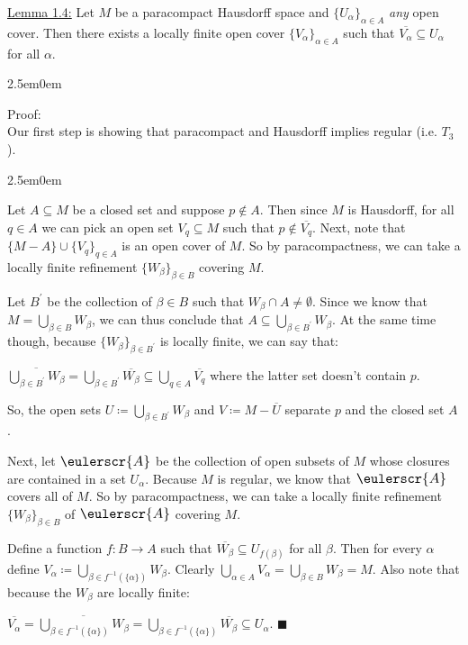 \documentclass{book}
\newcommand{\mathcalli}[1]{\text{\scalebox{1.11}{$\eulerscr{#1}$}}}
\newcommand{\exTwo}{%
   \color{Purple}%
   \fontsize{13}{15}\selectfont%
}
\newcommand{\exThreeP}{%
   \color{RedViolet}%
   \fontsize{12}{14}\selectfont%
}
\newcommand{\exPPP}{%
   \color{VioletRed}%
   \fontsize{12}{14}\selectfont%
}
\newenvironment{myIndent}{%
   \begin{adjustwidth}{2.5em}{0em}%
}{%
   \end{adjustwidth}%
}
\newcommand{\retTwo}{\hfill\bigbreak}
\begin{document}
\setul{0.14em}{0.07em}
\calibri

\exTwo\ul{Lemma 1.4:} Let $M$ be a paracompact Hausdorff space and $\{U_\alpha\}_{\alpha \in A}$ \textit{any} open cover. Then there exists a locally finite open cover $\{V_\alpha\}_{\alpha \in A}$ such that $\overline{V_\alpha} \subseteq U_\alpha$ for all $\alpha$.
\begin{myIndent}\exThreeP
	Proof:\\
	Our first step is showing that paracompact and Hausdorff implies regular (i.e. $T_3$).
	\begin{myIndent}\exPPP
		Let $A \subseteq M$ be a closed set and suppose $p \notin A$. Then since $M$ is Hausdorff, for all $q \in A$ we can pick an open set $V_q \subseteq M$ such that $p \notin \overline{V_q}$. Next, note that $\{M - A\} \cup \{V_q\}_{q \in A}$ is an open cover of $M$. So by paracompactness, we can take a locally finite refinement $\{W_\beta\}_{\beta \in B}$ covering $M$.\retTwo

		Let $B^\prime$ be the collection of $\beta \in B$ such that $W_\beta \cap A \neq \emptyset$. Since we know that\\ $M = \bigcup_{\beta \in B} W_\beta$, we can thus conclude that $A \subseteq \bigcup_{\beta \in B^\prime} W_\beta$. At the same time though, because $\{W_\beta\}_{\beta \in B^\prime}$ is locally finite, we can say that:
		
		{\centering$\overline{\bigcup_{\beta \in B^\prime}W_\beta} = \bigcup_{\beta \in B^\prime} \overline{W_\beta} \subseteq \bigcup_{q \in A} \overline{V_q}$ where the latter set doesn't contain $p$.\retTwo\par}

		So, the open sets $U \coloneqq \bigcup_{\beta \in B^\prime} W_\beta$ and $V \coloneqq M - \overline{U}$ separate $p$ and the closed set $A$.\retTwo
	\end{myIndent}

	Next, let $\mathcalli{A}$ be the collection of open subsets of $M$ whose closures are contained in a set $U_\alpha$. Because $M$ is regular, we know that $\mathcalli{A}$ covers all of $M$. So by paracompactness, we can take a locally finite refinement $\{W_\beta\}_{\beta \in B}$ of $\mathcalli{A}$ covering $M$.\retTwo

	Define a function $f : B \to A$ such that $\overline{W_\beta} \subseteq U_{f(\beta)}$ for all $\beta$. Then for every $\alpha$ define $V_\alpha \coloneqq \bigcup_{\beta \in f^{-1}(\{\alpha\})} W_\beta$. Clearly $\bigcup_{\alpha \in A} V_\alpha = \bigcup_{\beta \in B} W_\beta = M$. Also note that because the $W_\beta$ are locally finite:

	{\centering $\overline{V_\alpha} = \overline{\bigcup_{\beta \in f^{-1}(\{\alpha\})} W_\beta} = \bigcup_{\beta \in f^{-1}(\{\alpha\})} \overline{W_\beta} \subseteq U_\alpha$. $\blacksquare$\retTwo\par}
\end{myIndent}
\end{document}
